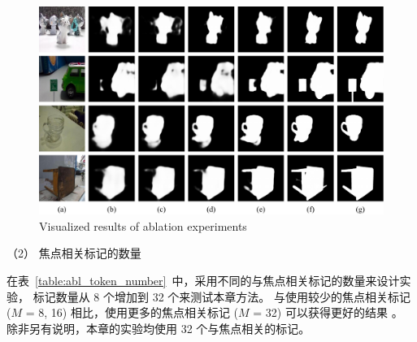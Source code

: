 \begin{figure}[t] 
	\includegraphics[width=0.99\linewidth]{figures/chapter3/self-comparsion-Use} 
	\centering
	{Visualized results of ablation experiments}
	\label{figure:self_comp}
\end{figure}

 



（2）
焦点相关标记的数量



在表~\ref{table:abl_token_number}~中，采用不同的与焦点相关标记的数量来设计实验，
标记数量从 8 个增加到 32 个来测试本章方法。
与使用较少的焦点相关标记 ($M$ = 8, 16) 相比，使用更多的焦点相关标记 ($M$ = 32) 可以获得更好的结果 。 
除非另有说明，本章的实验均使用 32 个与焦点相关的标记。 




